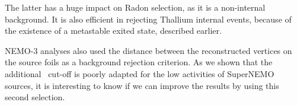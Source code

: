 The latter has a huge impact on Radon selection, as it is a non-internal background.
It is also efficient in rejecting Thallium internal events, because of the existence of a metastable exited state, described earlier.

NEMO-$3$ analyses also used the distance between the reconstructed vertices on the source foils as a background rejection criterion.
As we shown that the additional \Pint\ cut-off is poorly adapted for the low activities of SuperNEMO sources, it is interesting to know if we can improve the results by using this second selection.

